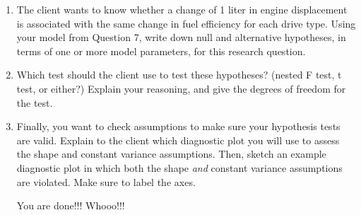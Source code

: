 \documentclass[11pt]{article}
\begin{document}
\begin{enumerate}
\pagebreak

\item The client wants to know whether a change of 1 liter in engine displacement is associated with the same change in fuel efficiency for each drive type. Using your model from Question 7, write down null and alternative hypotheses, in terms of one or more model parameters, for this research question.

\vspace{3cm}

\item Which test should the client use to test these hypotheses? (nested F test, t test, or either?) Explain your reasoning, and give the degrees of freedom for the test.

\vspace{3cm}


\item Finally, you want to check assumptions to make sure your hypothesis tests are valid. Explain to the client which diagnostic plot you will use to assess the shape and constant variance assumptions. Then, sketch an example diagnostic plot in which both the shape \textit{and} constant variance assumptions are violated. Make sure to label the axes.


\pagebreak



\huge{You are done!!! Whooo!!!}




\end{enumerate}




\end{document}
